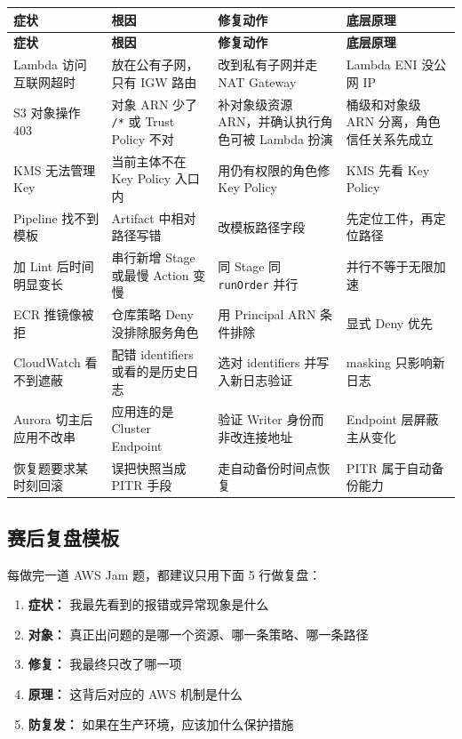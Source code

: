 \documentclass[12pt,a4paper]{article}
\begin{document}
\begin{longtable}{@{}L{3.05cm}L{3.75cm}L{3.35cm}L{3.85cm}@{}}
\textbf{症状} & \textbf{根因} & \textbf{修复动作} & \textbf{底层原理} \\
\midrule
\endfirsthead
{}
\textbf{症状} & \textbf{根因} & \textbf{修复动作} & \textbf{底层原理} \\
\midrule
\endhead
Lambda 访问互联网超时 & 放在公有子网，只有 IGW 路由 & 改到私有子网并走 NAT Gateway & Lambda ENI 没公网 IP \\
S3 对象操作 403 & 对象 ARN 少了 \texttt{/*} 或 Trust Policy 不对 & 补对象级资源 ARN，并确认执行角色可被 Lambda 扮演 & 桶级和对象级 ARN 分离，角色信任关系先成立 \\
KMS 无法管理 Key & 当前主体不在 Key Policy 入口内 & 用仍有权限的角色修 Key Policy & KMS 先看 Key Policy \\
Pipeline 找不到模板 & Artifact 中相对路径写错 & 改模板路径字段 & 先定位工件，再定位路径 \\
加 Lint 后时间明显变长 & 串行新增 Stage 或最慢 Action 变慢 & 同 Stage 同 \texttt{runOrder} 并行 & 并行不等于无限加速 \\
ECR 推镜像被拒 & 仓库策略 Deny 没排除服务角色 & 用 Principal ARN 条件排除 & 显式 Deny 优先 \\
CloudWatch 看不到遮蔽 & 配错 identifiers 或看的是历史日志 & 选对 identifiers 并写入新日志验证 & masking 只影响新日志 \\
Aurora 切主后应用不改串 & 应用连的是 Cluster Endpoint & 验证 Writer 身份而非改连接地址 & Endpoint 层屏蔽主从变化 \\
恢复题要求某时刻回滚 & 误把快照当成 PITR 手段 & 走自动备份时间点恢复 & PITR 属于自动备份能力 \\
\bottomrule
\end{longtable}

\subsection{赛后复盘模板}

\begin{guidebox}
  每做完一道 AWS Jam 题，都建议只用下面 5 行做复盘：
  \begin{enumerate}
    \item \textbf{症状：} 我最先看到的报错或异常现象是什么
    \item \textbf{对象：} 真正出问题的是哪一个资源、哪一条策略、哪一条路径
    \item \textbf{修复：} 我最终只改了哪一项
    \item \textbf{原理：} 这背后对应的 AWS 机制是什么
    \item \textbf{防复发：} 如果在生产环境，应该加什么保护措施
  \end{enumerate}
\end{guidebox}
\end{document}
